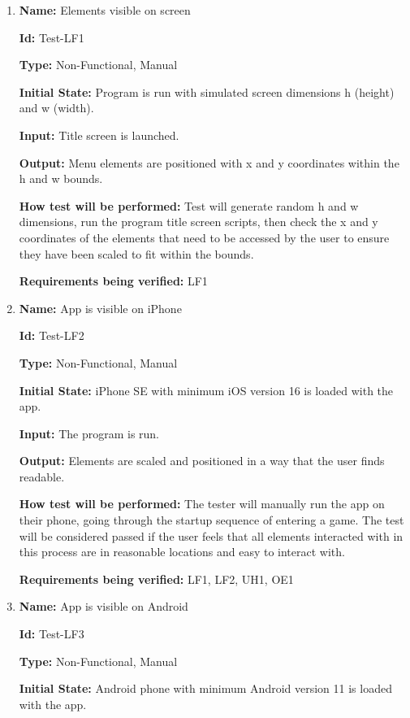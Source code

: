 \documentclass[12pt, titlepage]{article}
\begin{document}
\begin{enumerate}

\item{\textbf{Name:} Elements visible on screen} \label{itm:Test-LF1}

\textbf{Id:} Test-LF1

\textbf{Type:} Non-Functional, Manual
					
\textbf{Initial State:} Program is run with simulated screen dimensions h (height) and w (width).
					
\textbf{Input:} Title screen is launched.
					
\textbf{Output:} Menu elements are positioned with x and y coordinates within the h and w bounds. 
					
\textbf{How test will be performed:} Test will generate random h and w dimensions, run the program title screen scripts, then check the x and y coordinates of the elements that need to be accessed by the user to ensure they have been scaled to fit within the bounds. 

\textbf{Requirements being verified:} LF1

\item{\textbf{Name:} App is visible on iPhone} \label{itm:Test-LF2}

\textbf{Id:} Test-LF2

\textbf{Type:} Non-Functional, Manual
					
\textbf{Initial State:} iPhone SE with minimum iOS version 16 is loaded with the app.
					
\textbf{Input:} The program is run. 
					
\textbf{Output:} Elements are scaled and positioned in a way that the user finds readable. 
					
\textbf{How test will be performed:} The tester will manually run the app on their phone, going through the startup sequence of entering a game. The test will be considered passed if the user feels that all elements interacted with in this process are in reasonable locations and easy to interact with.

\textbf{Requirements being verified:} LF1, LF2, UH1, OE1

\item{\textbf{Name:} App is visible on Android} \label{itm:Test-LF3}

\textbf{Id:} Test-LF3

\textbf{Type:} Non-Functional, Manual
					
\textbf{Initial State:} Android phone with minimum Android version 11 is loaded with the app.
					

\end{enumerate}
\end{document}
